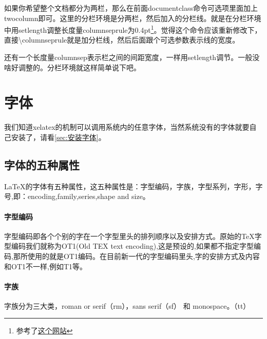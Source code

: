\begin{multicols}{2}
\setlength{\columnseprule}{0.4pt}
如果你希望整个文档都分为两栏，那么在前面documentclass命令可选项里面加上twocolumn即可。这里的分栏环境是分两栏，然后加入的分栏线。就是在分栏环境中用setlength调整长度量columnseprule为0.4pt\footnote{参考了\href{http://texblog.org/tag/columnseprule/}{这个网站}}。觉得这个命令应该重新修改下，直接\textbackslash columnseprule就是加分栏线，然后后面跟个可选参数表示线的宽度。

还有一个长度量columnsep表示栏之间的间距宽度，一样用setlength调节。一般没啥好调整的。分栏环境就这样简单说下吧。
\end{multicols}


\section{字体}
我们知道xelatex的机制可以调用系统内的任意字体，当然系统没有的字体就要自己安装了，请看\ref{sec:安装字体}。

\subsection{字体的五种属性}
\LaTeX 的字体有五种属性，这五种属性是：字型编码，字族，字型系列，字形，字号,即：encoding,family,series,shape and size。

\paragraph{字型编码}
字型编码即各个个别的字在一个字型里头的排列顺序以及安排方式。原始的\TeX 字型编码我们就称为OT1(Old TEX text encoding),这是预设的,如果都不指定字型编码,那所使用的就是OT1编码。在目前新一代的字型编码里头,字的安排方式及内容和OT1不一样,例如T1等。


\paragraph{字族}
字族分为三大类，roman or serif（rm），sans serif（sf） 和 monospace。（tt）


